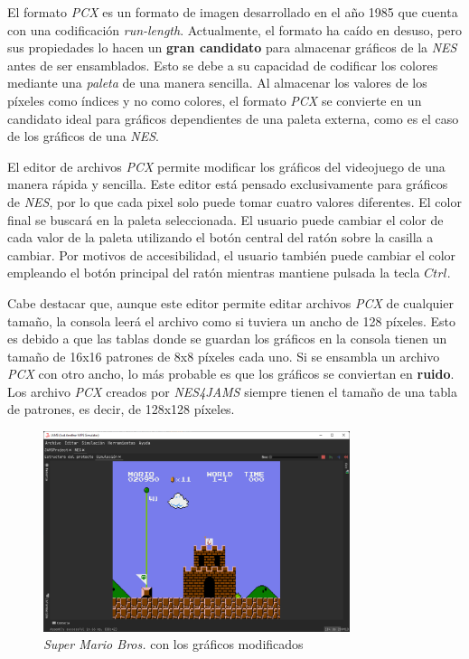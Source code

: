 El formato \textit{PCX} es un formato de imagen desarrollado
en el año 1985 que cuenta con una codificación \textit{run-length}.
Actualmente, el formato ha caído en desuso, pero sus propiedades
lo hacen un \textbf{gran candidato} para almacenar gráficos
de la \textit{NES} antes de ser ensamblados.
Esto se debe a su capacidad de codificar los colores mediante
una \textit{paleta} de una manera sencilla.
Al almacenar los valores de los píxeles como índices y no
como colores, el formato \textit{PCX} se convierte en un
candidato ideal para gráficos dependientes de una paleta
externa, como es el caso de los gráficos de una \textit{NES}.

El editor de archivos \textit{PCX} permite modificar los
gráficos del videojuego de una manera rápida y sencilla.
Este editor está pensado exclusivamente para gráficos
de \textit{NES}, por lo que cada pixel solo puede tomar
cuatro valores diferentes.
El color final se buscará en la paleta seleccionada.
El usuario puede cambiar el color de cada valor de la
paleta utilizando el botón central del ratón sobre
la casilla a cambiar.
Por motivos de accesibilidad, el usuario también puede
cambiar el color empleando el botón principal del
ratón mientras mantiene pulsada la tecla $Ctrl$.

Cabe destacar que, aunque este editor permite editar
archivos \textit{PCX} de cualquier tamaño, la consola
leerá el archivo como si tuviera un ancho de 128 píxeles.
Esto es debido a que las tablas donde se guardan los gráficos
en la consola tienen un tamaño de 16x16 patrones
de 8x8 píxeles cada uno.
Si se ensambla un archivo \textit{PCX} con otro ancho,
lo más probable es que los gráficos se conviertan en
\textbf{ruido}.
Los archivo \textit{PCX} creados por \textit{NES4JAMS}
siempre tienen el tamaño de una tabla de patrones,
es decir, de 128x128 píxeles.

\begin{figure}[h]
    \centering
    \includegraphics[width=0.8\textwidth]{images/nes/nes-graphics-change}
    \caption{\textit{Super Mario Bros.} con los gráficos modificados}
    \label{fig:nes-graphics-change}
\end{figure}

